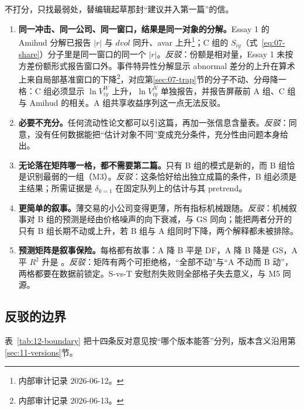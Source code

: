 \documentclass[a4paper,11pt]{ctexart}
\begin{document}
不打分，只找最弱处，替编辑起草那封“建议并入第一篇”的信。

\begin{enumerate}[label=A\arabic*., leftmargin=*, itemsep=4pt]
\item \textbf{同一冲击、同一公司、同一窗口，结果是同一对象的分解。}Essay 1 的 Amihud 分解已报告 $|r|$ 与 $\mathit{dvol}$ 同升、avar 上升\footnote{内部审计记录 2026-06-12。}；C 组的 $S_{iy}$（式~\eqref{eq:07-share}）分子里是同一窗口的同一个 $|r|$。\emph{反驳}：份额是相对量，Essay 1 未按方差份额形式报告窗口外。事件特异性分解显示 abnormal 差分的上升在算术上来自局部基准窗口的下降\footnote{内部审计记录 2026-06-13。}，对应第\ref{sec:07-trap}节的分子不动、分母降一格：C 组必须显示 $\ln V^{W}_{iy}$ 上升，$\ln V^{N}_{iy}$ 单独报告，并报告屏蔽前 A 组、C 组与 Amihud 的相关。A 组共享收益序列这一点无法反驳。

\item \textbf{\citet{davilaparlatore2021} 必要不充分。}任何流动性论文都可以引这篇，再加一张信息含量表。\emph{反驳}：同意，没有任何数据能把“估计对象不同”变成充分条件，充分性由问题本身给出。

\item \textbf{无论落在矩阵哪一格，都不需要第二篇。}只有 B 组的模式是新的，而 B 组恰是识别最弱的一组（M3）。\emph{反驳}：这条恰好给出独立成篇的条件，B 组必须是主结果；所需证据是 $\delta_{k=1}$ 在固定队列上的估计与其 pretrend。

\item \textbf{更简单的叙事。}薄交易的小公司变得更薄，所有指标机械跟随。\emph{反驳}：机械叙事对 B 组的预测是经由价格噪声的向下衰减，与 GS 同向；能把两者分开的只有 B 组长期不动或上升，若 B 组与 A 组同时下降，两个解释都未被排除。

\item \textbf{预测矩阵是叙事保险。}每格都有故事：A 降 B 平是 DF，A 降 B 降是 GS，A 平 $R^2$ 升是 \citet{pengxiong2006}。\emph{反驳}：矩阵有两个可拒绝格，“全部不动”与“A 不动而 B 动”，两格都要在数据前锁定。S-vs-T 安慰剂失败则全部格子失去意义，与 M5 同源。
\end{enumerate}

\subsection{反驳的边界}\label{sec:12-boundary}

表~\ref{tab:12-boundary} 把十四条反对意见按“哪个版本能答”分列，版本含义沿用第\ref{sec:11-versions}节。
\end{document}

